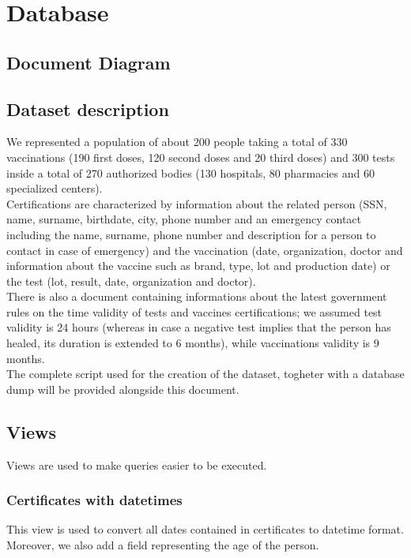 \documentclass[12pt, a4paper]{article}
\begin{document}
\clearpage

\section{Database}

\subsection{Document Diagram}

\blindtext

\subsection{Dataset description}

We represented a population of about 200 people taking a total of 330 vaccinations
(190 first doses, 120 second doses and 20 third doses) and 300 tests inside
a total of 270 authorized bodies (130 hospitals, 80 pharmacies and 60 
specialized centers). \\
Certifications are characterized by information about the related person
(SSN, name, surname, birthdate, city, phone number and an emergency contact
including the name, surname, phone number and description for a person to 
contact in case of emergency) and the vaccination (date, organization, doctor 
and information about the vaccine such as brand, type, lot and production 
date) or the test (lot, result, date, organization and doctor). \\
There is also a document containing informations about the latest government rules
on the time validity of tests and vaccines certifications; we assumed test validity is 
24 hours (whereas in case a negative test implies that the person has healed, its duration is 
extended to 6 months), while vaccinations validity is 9 months. \\
The complete script used for the creation of the dataset, togheter with a 
database dump will be provided alongside this document.

\subsection{Views}
Views are used to make queries easier to be executed.

\subsubsection{Certificates with datetimes}
This view is used to convert all dates contained in certificates to datetime format. Moreover, 
we also add a field representing the age of the person.
\end{document}
